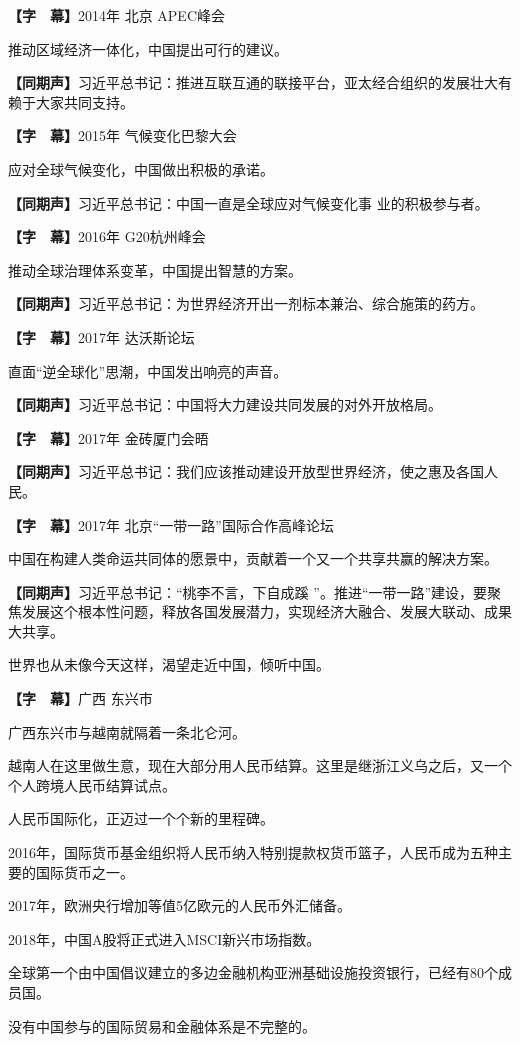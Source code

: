 \documentclass{ctexart}
\newcommand{\zkh}[1]{\textbf{\hspace{-2.7em} 【#1】}}
\begin{document}
\zkh{字　幕}2014年 北京 APEC峰会

推动区域经济一体化，中国提出可行的建议。

\zkh{同期声}习近平总书记：推进互联互通的联接平台，亚太经合组织的发展壮大有赖于大家共同支持。

\zkh{字　幕}2015年 气候变化巴黎大会

应对全球气候变化，中国做出积极的承诺。

\zkh{同期声}习近平总书记：中国一直是全球应对气候变化事 业的积极参与者。

\zkh{字　幕}2016年 G20杭州峰会

推动全球治理体系变革，中国提出智慧的方案。

\zkh{同期声}习近平总书记：为世界经济开出一剂标本兼治、综合施策的药方。

\zkh{字　幕}2017年 达沃斯论坛

直面``逆全球化''思潮，中国发出响亮的声音。

\zkh{同期声}习近平总书记：中国将大力建设共同发展的对外开放格局。

\zkh{字　幕}2017年 金砖厦门会晤

\zkh{同期声}习近平总书记：我们应该推动建设开放型世界经济，使之惠及各国人民。

\zkh{字　幕}2017年 北京``一带一路''国际合作高峰论坛

中国在构建人类命运共同体的愿景中，贡献着一个又一个共享共赢的解决方案。

\zkh{同期声}习近平总书记：``桃李不言，下自成蹊 
''。推进``一带一路''建设，要聚焦发展这个根本性问题，释放各国发展潜力，实现经济大融合、发展大联动、成果大共享。

世界也从未像今天这样，渴望走近中国，倾听中国。

\zkh{字　幕}广西 东兴市

广西东兴市与越南就隔着一条北仑河。

越南人在这里做生意，现在大部分用人民币结算。这里是继浙江义乌之后，又一个个人跨境人民币结算试点。

人民币国际化，正迈过一个个新的里程碑。

2016年，国际货币基金组织将人民币纳入特别提款权货币篮子，人民币成为五种主要的国际货币之一。

2017年，欧洲央行增加等值5亿欧元的人民币外汇储备。

2018年，中国A股将正式进入MSCI新兴市场指数。

全球第一个由中国倡议建立的多边金融机构亚洲基础设施投资银行，已经有80个成员国。

没有中国参与的国际贸易和金融体系是不完整的。
\end{document}
